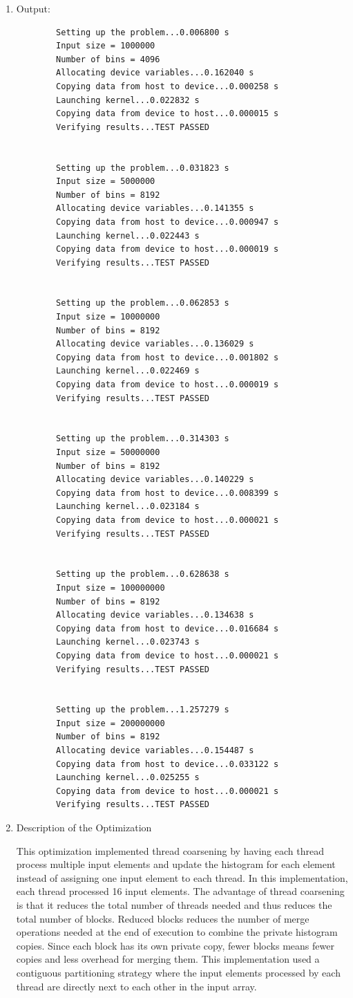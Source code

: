 \documentclass{article}
\begin{document}
\begin{enumerate}
	\item Output:
	\begin{verbatim}
		Setting up the problem...0.006800 s
		Input size = 1000000
		Number of bins = 4096
		Allocating device variables...0.162040 s
		Copying data from host to device...0.000258 s
		Launching kernel...0.022832 s
		Copying data from device to host...0.000015 s
		Verifying results...TEST PASSED
		
		
		Setting up the problem...0.031823 s
		Input size = 5000000
		Number of bins = 8192
		Allocating device variables...0.141355 s
		Copying data from host to device...0.000947 s
		Launching kernel...0.022443 s
		Copying data from device to host...0.000019 s
		Verifying results...TEST PASSED
		
		
		Setting up the problem...0.062853 s
		Input size = 10000000
		Number of bins = 8192
		Allocating device variables...0.136029 s
		Copying data from host to device...0.001802 s
		Launching kernel...0.022469 s
		Copying data from device to host...0.000019 s
		Verifying results...TEST PASSED
		
		
		Setting up the problem...0.314303 s
		Input size = 50000000
		Number of bins = 8192
		Allocating device variables...0.140229 s
		Copying data from host to device...0.008399 s
		Launching kernel...0.023184 s
		Copying data from device to host...0.000021 s
		Verifying results...TEST PASSED
		
		
		Setting up the problem...0.628638 s
		Input size = 100000000
		Number of bins = 8192
		Allocating device variables...0.134638 s
		Copying data from host to device...0.016684 s
		Launching kernel...0.023743 s
		Copying data from device to host...0.000021 s
		Verifying results...TEST PASSED
		
		
		Setting up the problem...1.257279 s
		Input size = 200000000
		Number of bins = 8192
		Allocating device variables...0.154487 s
		Copying data from host to device...0.033122 s
		Launching kernel...0.025255 s
		Copying data from device to host...0.000021 s
		Verifying results...TEST PASSED
	\end{verbatim}
	
	\item Description of the Optimization
	
	This optimization implemented thread coarsening by having each thread process multiple input elements and update the histogram for each element instead of assigning one input element to each thread. In this implementation, each thread processed 16 input elements. The advantage of thread coarsening is that it reduces the total number of threads needed and thus reduces the total number of blocks. Reduced blocks reduces the number of merge operations needed at the end of execution to combine the private histogram copies. Since each block has its own private copy, fewer blocks means fewer copies and less overhead for merging them. This implementation used a contiguous partitioning strategy where the input elements processed by each thread are directly next to each other in the input array. 
	

\end{enumerate}
\end{document}
